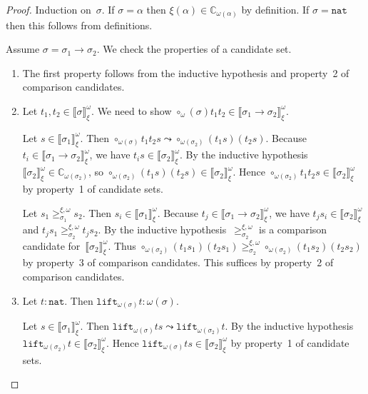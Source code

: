 \documentclass[a4paper,UKenglish,cleveref,autoref,numberwithinsect]{lipics-v2019}
\theoremstyle{definition}
\newcommand{\arrtype}{\rightarrow}
\newcommand{\nat}{\mathtt{nat}}
\newcommand{\lift}{\mathtt{lift}}
\newcommand{\Cb}{\mathbb{C}}
\newcommand{\val}[3]{\ensuremath{\llbracket#1\rrbracket_{#2}^{#3}}}
\newcommand{\gteq}[3]{\ensuremath{\ge_{#1}^{#2,#3}}}
\begin{document}
\begin{proof}
  Induction on~$\sigma$. If $\sigma=\alpha$ then $\xi(\alpha) \in
  \Cb_{\omega(\alpha)}$ by definition. If $\sigma=\nat$ then this
  follows from definitions.

  Assume $\sigma=\sigma_1\arrtype\sigma_2$. We check the properties of
  a candidate set.
  \begin{enumerate}
  \item The first property follows from the inductive hypothesis and
    property~2 of comparison candidates.
  \item Let $t_1,t_2 \in \val{\sigma}{\xi}{\omega}$. We need to show
    $\circ_\omega(\sigma) t_1 t_2 \in
    \val{\sigma_1\arrtype\sigma_2}{\xi}{\omega}$.

    Let $s \in \val{\sigma_1}{\xi}{\omega}$. Then
    $\circ_{\omega(\sigma)} t_1 t_2 s \leadsto
    \circ_{\omega(\sigma_2)} (t_1 s) (t_2 s)$. Because $t_i \in
    \val{\sigma_1\arrtype\sigma_2}{\xi}{\omega}$, we have $t_i s \in
    \val{\sigma_2}{\xi}{\omega}$. By the inductive
    hypothesis~$\val{\sigma_2}{\xi}{\omega} \in
    \Cb_{\omega(\sigma_2)}$, so $\circ_{\omega(\sigma_2)} (t_1 s) (t_2
    s) \in \val{\sigma_2}{\xi}{\omega}$. Hence
    $\circ_{\omega(\sigma_2)} t_1 t_2 s \in
    \val{\sigma_2}{\xi}{\omega}$ by property~1 of candidate sets.

    Let $s_1 \gteq{\sigma_1}{\xi}{\omega} s_2$. Then $s_i \in
    \val{\sigma_1}{\xi}{\omega}$. Because $t_j \in
    \val{\sigma_1\arrtype\sigma_2}{\xi}{\omega}$, we have $t_j s_i \in
    \val{\sigma_2}{\xi}{\omega}$ and $t_j s_1
    \gteq{\sigma_2}{\xi}{\omega} t_j s_2$. By the inductive
    hypothesis~$\gteq{\sigma_2}{\xi}{\omega}$ is a comparison
    candidate for~$\val{\sigma_2}{\xi}{\omega}$. Thus
    $\circ_{\omega(\sigma_2)} (t_1 s_1) (t_2 s_1)
    \gteq{\sigma_2}{\xi}{\omega} \circ_{\omega(\sigma_2)} (t_1 s_2)
    (t_2 s_2)$ by property~3 of comparison candidates. This suffices
    by property~2 of comparison candidates.
  \item Let $t : \nat$. Then $\lift_{\omega(\sigma)} t :
    \omega(\sigma)$.

    Let $s \in \val{\sigma_1}{\xi}{\omega}$. Then
    $\lift_{\omega(\sigma)}t s \leadsto \lift_{\omega(\sigma_2)}
    t$. By the inductive hypothesis $\lift_{\omega(\sigma_2)} t \in
    \val{\sigma_2}{\xi}{\omega}$. Hence $\lift_{\omega(\sigma)}t s \in
    \val{\sigma_2}{\xi}{\omega}$ by property~1 of candidate sets.


\end{enumerate}
\end{proof}
\end{document}
